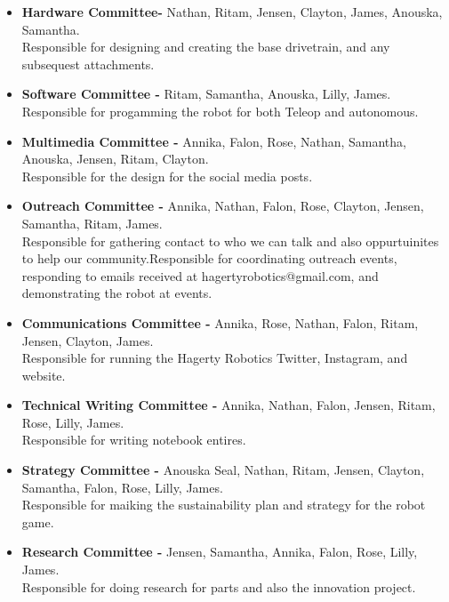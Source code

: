 \insertCommittees
{}


\begin{itemize}

\item \textbf{Hardware Committee-} Nathan, Ritam, Jensen, Clayton, James, Anouska, Samantha. \\ Responsible for designing and creating the base drivetrain, and any subsequest attachments.

\item \textbf{Software Committee -} Ritam, Samantha, Anouska, Lilly, James.  \\ Responsible for progamming the robot for both Teleop and autonomous.

\item \textbf{Multimedia Committee -} Annika, Falon, Rose, Nathan, Samantha, Anouska, Jensen, Ritam, Clayton. \\Responsible for the design for the social media posts.

\item \textbf{Outreach Committee -} Annika, Nathan, Falon, Rose, Clayton, Jensen, Samantha, Ritam, James. \\  Responsible for gathering contact to who we can talk and also oppurtuinites to help our community.Responsible for coordinating outreach events, responding to emails received at hagertyrobotics@gmail.com, and demonstrating the robot at events.

\item \textbf{Communications Committee -} Annika, Rose, Nathan, Falon, Ritam, Jensen, Clayton, James. \\ 
Responsible for running the Hagerty Robotics Twitter, Instagram, and website. 

\item \textbf{Technical Writing Committee -} Annika, Nathan, Falon, Jensen, Ritam, Rose, Lilly, James. \\
Responsible for writing notebook entires. 

\item \textbf{Strategy Committee -} Anouska Seal, Nathan, Ritam, Jensen, Clayton, Samantha, Falon, Rose, Lilly, James. \\ Responsible for maiking the sustainability plan and strategy for the robot game. 

\item \textbf{Research Committee -} Jensen, Samantha, Annika, Falon, Rose, Lilly, James. \\ Responsible for doing research for parts and also the innovation project.

\end{itemize} 
